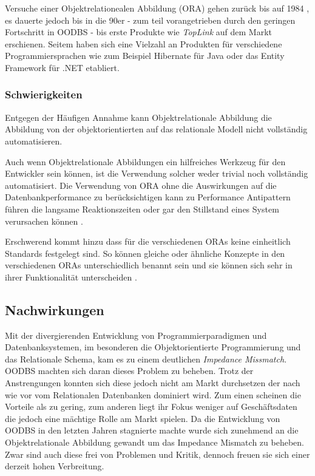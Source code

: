 Versuche einer Objektrelationealen Abbildung (ORA) gehen zurück bis auf 1984 \cite{ireland2009}, es dauerte jedoch bis in die 90er - zum teil vorangetrieben durch den geringen Fortschritt in OODBS - bis erste Produkte wie \emph{TopLink} auf dem Markt erschienen. Seitem haben sich eine Vielzahl an Produkten für verschiedene Programmiersprachen wie zum Beispiel Hibernate für Java oder das Entity Framework für .NET etabliert. 



\subsubsection{Schwierigkeiten}
Entgegen der Häufigen Annahme kann Objektrelationale Abbildung die Abbildung von der objektorientierten auf das relationale Modell nicht vollständig automatisieren. 

Auch wenn Objektrelationale Abbildungen ein hilfreiches Werkzeug für den Entwickler sein können, ist die Verwendung solcher weder trivial noch vollständig automatisiert. Die Verwendung von ORA ohne die Auswirkungen auf die Datenbankperformance zu berücksichtigen kann zu Performance Antipattern führen die langsame Reaktionszeiten oder gar den Stillstand eines System verursachen können \cite{chen2014}.

Erschwerend kommt hinzu dass für die verschiedenen ORAs keine einheitlich Standards festgelegt sind. So können gleiche oder ähnliche Konzepte in den verschiedenen ORAs unterschiedlich benannt sein und sie können sich sehr in ihrer Funktionalität unterscheiden \cite{torres2017}.


\subsection{Nachwirkungen}
Mit der divergierenden Entwicklung von Programmierparadigmen und Datenbanksystemen, im besonderen die Objektorientierte Programmierung und das Relationale Schema, kam es zu einem deutlichen \emph{Impedance Missmatch}. 
OODBS machten sich daran dieses Problem zu beheben. Trotz der Anstrengungen konnten sich diese jedoch nicht am Markt durchsetzen der nach wie vor vom Relationalen Datenbanken dominiert wird. Zum einen scheinen die Vorteile als zu gering, zum anderen liegt ihr Fokus weniger auf Geschäftsdaten die jedoch eine mächtige Rolle am Markt spielen.
Da die Entwicklung von OODBS in den letzten Jahren stagnierte machte wurde sich zunehmend an die Objektrelationale Abbildung gewandt um das Impedance Mismatch zu beheben. Zwar sind auch diese frei von Problemen und Kritik, dennoch freuen sie sich einer derzeit hohen Verbreitung.


